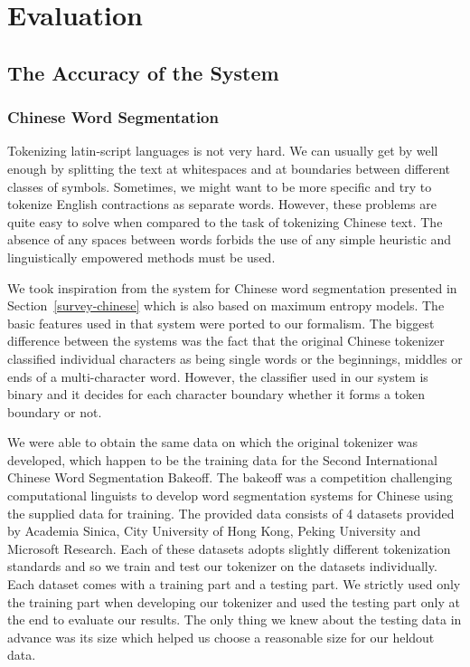 \chapter{Evaluation}
\label{chap:eval}



\section{The Accuracy of the System}
\label{sec:eval-acc}

\subsection{Chinese Word Segmentation}
\label{ssec:eval-acc-chinese}

Tokenizing latin-script languages is not very hard. We can usually get by well
enough by splitting the text at whitespaces and at boundaries between different
classes of symbols. Sometimes, we might want to be more specific and try to
tokenize English contractions as separate words. However, these problems are
quite easy to solve when compared to the task of tokenizing Chinese text. The
absence of any spaces between words forbids the use of any simple heuristic and
linguistically empowered methods must be used.

We took inspiration from the system for Chinese word segmentation presented in
Section~\ref{survey-chinese} which is also based on maximum entropy models. The
basic features used in that system were ported to our formalism. The biggest
difference between the systems was the fact that the original Chinese tokenizer
classified individual characters as being single words or the beginnings,
middles or ends of a multi-character word. However, the classifier used in
our system is binary and it decides for each character boundary whether it
forms a token boundary or not.

We were able to obtain the same data on which the original tokenizer was
developed, which happen to be the training data for the Second International
Chinese Word Segmentation Bakeoff. The bakeoff was a competition challenging
computational linguists to develop word segmentation systems for Chinese using
the supplied data for training. The provided data consists of 4 datasets
provided by Academia Sinica, City University of Hong Kong, Peking University
and Microsoft Research. Each of these datasets adopts slightly different
tokenization standards and so we train and test our tokenizer on the datasets
individually. Each dataset comes with a training part and a testing part. We
strictly used only the training part when developing our tokenizer and used the
testing part only at the end to evaluate our results. The only thing we knew
about the testing data in advance was its size which helped us choose a
reasonable size for our heldout data.

